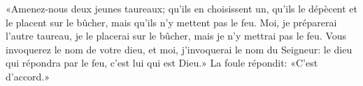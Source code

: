 «Amenez-nous deux jeunes taureaux;
	qu’ils en choisissent un, qu’ils le dépècent et le placent sur le bûcher,
	mais qu’ils n’y mettent pas le feu.
Moi, je préparerai l’autre taureau, je le placerai sur le bûcher,
	mais je n’y mettrai pas le feu.
Vous invoquerez le nom de votre dieu, et moi, j’invoquerai le nom du Seigneur:
	le dieu qui répondra par le feu, c’est lui qui est Dieu.»
La foule répondit: «C’est d’accord.»
